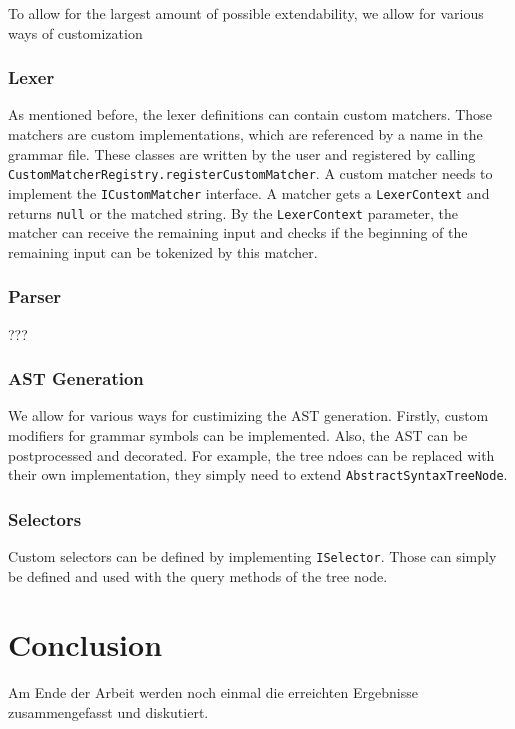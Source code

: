 To allow for the largest amount of possible extendability, we allow for various ways of customization

\subsubsection{Lexer}

As mentioned before, the lexer definitions can contain custom matchers. Those matchers are custom implementations, which are referenced by a name in the grammar file. These classes are written by the user and registered by calling \verb|CustomMatcherRegistry.registerCustomMatcher|. A custom matcher needs to implement the \verb|ICustomMatcher| interface. A matcher gets a \verb|LexerContext| and returns \verb|null| or the matched string. By the \verb|LexerContext| parameter, the matcher can receive the remaining input and checks if the beginning of the remaining input can be tokenized by this matcher.

\subsubsection{Parser}

???


\subsubsection{AST Generation}

We allow for various ways for custimizing the AST generation. Firstly, custom modifiers for grammar symbols can be implemented. Also, the AST can be postprocessed and decorated. For example, the tree ndoes can be replaced with their own implementation, they simply need to extend \verb|AbstractSyntaxTreeNode|.

\subsubsection{Selectors}

Custom selectors can be defined by implementing \verb|ISelector|. Those can simply be defined and used with the query methods of the tree node.




\section{Conclusion}

Am Ende der Arbeit werden noch einmal die erreichten Ergebnisse
zusammengefasst und diskutiert.

